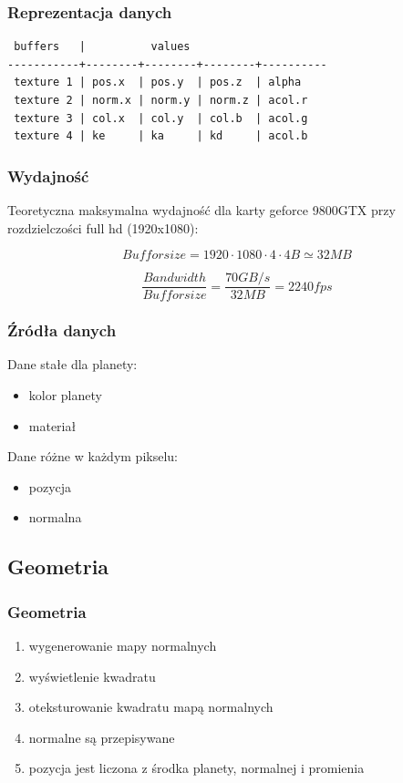 \documentclass{beamer}
\begin{document}
\begin{frame}[fragile]
	\frametitle{Reprezentacja danych}

	\begin{verbatim}
 buffers   |          values 
-----------+--------+--------+--------+----------
 texture 1 | pos.x  | pos.y  | pos.z  | alpha
 texture 2 | norm.x | norm.y | norm.z | acol.r
 texture 3 | col.x  | col.y  | col.b  | acol.g   
 texture 4 | ke     | ka     | kd     | acol.b
	\end{verbatim}
\end{frame}

\frame
{
	\frametitle{Wydajność}

	Teoretyczna maksymalna wydajność dla karty geforce 9800GTX przy rozdzielczości full hd (1920x1080):

	$$ Buffor size = 1920 \cdot 1080 \cdot 4 \cdot 4B \simeq 32MB $$

	\pause

	$$ \frac{Bandwidth}{Buffor size} = \frac{70GB/s}{32MB} = 2240 fps $$
}

\frame
{
	\frametitle{Źródła danych}

	Dane stałe dla planety:

	\begin{itemize}
	\item kolor planety
	\item materiał
	\end{itemize}

	Dane różne w każdym pikselu:

	\begin{itemize}
	\item pozycja 
	\item normalna
	\end{itemize}
}

\subsection{Geometria}\label{sub:geometria}

\frame
{
	\frametitle{Geometria}

	\begin{enumerate}
	\item wygenerowanie mapy normalnych
	\item wyświetlenie kwadratu
	\item oteksturowanie kwadratu mapą normalnych
	\item normalne są przepisywane
	\item pozycja jest liczona z środka planety, normalnej i promienia
	\end{enumerate}
}
\end{document}
